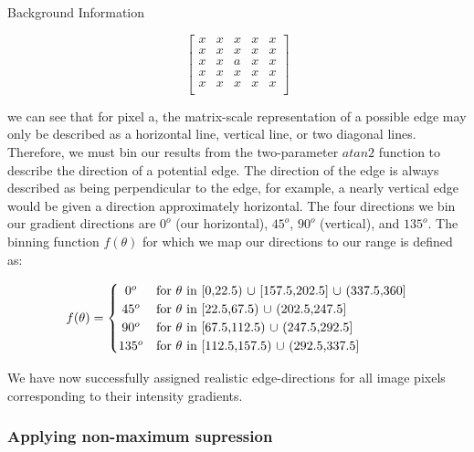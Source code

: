 \documentclass[a4paper,12pt]{article}
\begin{document}
\begin{section}{Background Information}
\singlespacing
\begin{center}
\[
\begin{bmatrix}
x & x & x & x & x\\
x & x & x & x & x\\
x & x & a & x & x\\
x & x & x & x & x\\
x & x & x & x & x\\	
\end{bmatrix}
\]
\end{center}
\doublespacing

we can see that for pixel a, the matrix-scale representation of a possible edge may only be described as a horizontal line, vertical line, or two diagonal lines.
Therefore, we must bin our results from the two-parameter $atan2$ function to describe the direction of a potential edge.
The direction of the edge is always described as being perpendicular to the edge, for example, a nearly vertical edge would be given a direction approximately horizontal.
The four directions we bin our gradient directions are $0^o$ (our horizontal), $45^o$, $90^o$ (vertical), and $135^o$.
The binning function $f(\theta)$ for which we map our directions to our range is defined as:

\singlespacing
\begin{center}
\[
f(\theta) = \left\{\def\arraystretch{1.2}%
  \begin{array}{@{}c@{\quad}l@{}}
	0^o & \text{for $\theta$ in [0,22.5) $\cup$ [157.5,202.5] $\cup$ (337.5,360]}\\
	45^o & \text{for $\theta$ in [22.5,67.5) $\cup$ (202.5,247.5]}\\
	90^o & \text{for $\theta$ in [67.5,112.5) $\cup$ (247.5,292.5]}\\
	135^o & \text{for $\theta$ in [112.5,157.5) $\cup$ (292.5,337.5]}\\
  \end{array}\right.
\]
\end{center} 
\doublespacing

We have now successfully assigned realistic edge-directions for all image pixels corresponding to their intensity gradients.

\subsubsection{Applying non-maximum supression}


\end{section}
\end{document}
